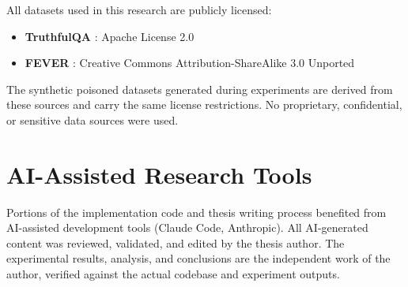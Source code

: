 All datasets used in this research are publicly licensed:
\begin{itemize}
    \item \textbf{TruthfulQA} \parencite{lin2022truthfulqa}: Apache License 2.0
    \item \textbf{FEVER} \parencite{thorne2018fever}: Creative Commons Attribution-ShareAlike 3.0 Unported
\end{itemize}

The synthetic poisoned datasets generated during experiments are derived from these sources and carry the same license restrictions. No proprietary, confidential, or sensitive data sources were used.

\section{AI-Assisted Research Tools}

Portions of the implementation code and thesis writing process benefited from AI-assisted development tools (Claude Code, Anthropic). All AI-generated content was reviewed, validated, and edited by the thesis author. The experimental results, analysis, and conclusions are the independent work of the author, verified against the actual codebase and experiment outputs.
